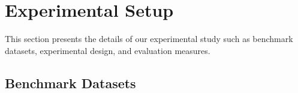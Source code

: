 \section{Experimental Setup}
\label{sec:Evaluation}
This section presents the details of our experimental study such as benchmark datasets, experimental design, and evaluation measures.


\subsection{Benchmark Datasets}

